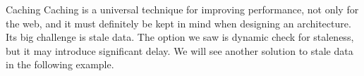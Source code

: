 \documentclass[a4paper]{article}
\begin{document}
\begin{parag}{Caching}
    Caching is a universal technique for improving performance, not only for the web, and it must definitely be kept in mind when designing an architecture. Its big challenge is stale data. The option we saw is dynamic check for staleness, but it may introduce significant delay. We will see another solution to stale data in the following example.
\end{parag}
\end{document}
